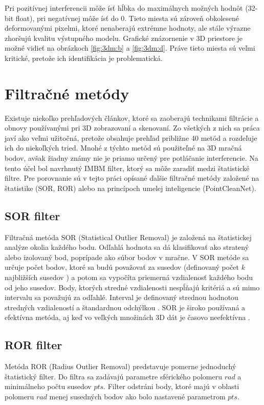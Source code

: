 Pri pozitívnej interferencii môže ísť hĺbka do maximálnych možných hodnôt (32-bit float), pri negatívnej môže ísť do 0. Tieto miesta sú zároveň obkolesené deformovanými pixelmi, ktoré nenaberajú extrémne hodnoty, ale stále výrazne zhoršujú kvalitu výstupného modelu. Grafické znázornenie v 3D priestore je možné vidieť na obrázkoch \ref{fig:3dm:b} a \ref{fig:3dm:d}. Práve tieto miesta sú veľmi kritické, pretože ich identifikácia je problematická. 

\section{Filtračné metódy}
\label{sec:filtmethods}

Existuje niekoľko prehľadových článkov, ktoré sa zaoberajú technikami filtrácie a obnovy používanými pri 3D zobrazovaní a skenovaní. Zo všetkých z nich sa práca \cite{Han} javí ako veľmi užitočná, pretože obsahuje prehľad približne 40 metód a rozdeľuje ich do niekoľkých tried. Mnohé z týchto metód sú použiteľné na 3D mračná bodov, avšak žiadny známy nie je priamo určený pre potláčanie interferencie. Na tento účel bol navrhnutý IMBM filter, ktorý sa môže zaradiť medzi štatistické filtre. Pre porovnanie sú v tejto práci opísané ďalšie filtračné metódy založené na štatistike (SOR, ROR) alebo na princípoch umelej inteligencie (PointCleanNet).   

\subsection{SOR filter}

Filtračná metóda SOR (Statistical Outlier Removal) je založená na štatistickej analýze okolia každého bodu. Odľahlá hodnota sa dá klasifikovať ako stratený alebo izolovaný bod, poprípade ako súbor bodov v mračne. V SOR metóde sa určuje počet bodov, ktoré sa budú považovať za susedov (definovaný počet $k$ najbližších susedov \cite{Pirotti}) a potom sa vypočíta priemerná vzdialenosť každého bodu od jeho susedov. Body, ktorých stredné vzdialenosti nespĺňajú kritériá a sú mimo intervalu sa považujú za odľahlé. Interval je definovaný strednou hodnotou stredných vzdialeností a štandardnou odchýlkou \cite{Corso}. SOR je široko používaná a efektívna metóda, aj keď vo veľkých množinách 3D dát je časovo neefektívna  \cite{Balta}.

\subsection{ROR filter}
Metóda ROR (Radius Outlier Removal) predstavuje pomerne jednoduchý štatistický filter. Do filtra sa zadávajú parametre sférického polomeru $rad$ a minimálneho počtu susedov $pts$. Filter odstráni body, ktoré majú v oblasti polomeru $rad$ menej susedných bodov ako bolo nastavené parametrom $pts$.


